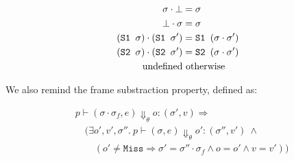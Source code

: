 \documentclass[,a4paper,oneside]{article}
\newcommand{\code}[1]{\texttt{#1}}
\newcommand{\st}[0]{\sigma}
\newcommand{\evalsto}[3]{\ensuremath{p\vdash(#1)\Downarrow_\theta#2:(#3)}}
\newcommand{\Miss}[0]{\code{Miss}}
\begin{document}
\begin{align*}
	\sigma \cdot \bot &= \sigma\\
	\bot \cdot \sigma &= \sigma\\
	(\sone\st) \cdot (\sone\st') &= \sone(\st\cdot\st')\\
	(\stwo\st) \cdot (\stwo\st') &= \stwo(\st\cdot\st')\\
	\text{undefined}&\text{ otherwise}
\end{align*}

We also remind the frame substraction property, defined as:


\begin{align*}
	&\evalsto{\st\cdot\st_f,e}{o}{\st',v}\Longrightarrow\\
	&\quad(\exists o',v',\st''.~\evalsto{\st,e}{o'}{\st'',v'}~\land\\
	&\qquad(o'\neq \Miss \Rightarrow \st'=\st''\cdot\st_f\land o=o'\land v=v'))
\end{align*}

\newcommand{\proofref}[1]{\textbf{\cal(#1)}}
\newcommand{\proofitem}[1]{\item\textbf{\cal(#1)}~}
\end{document}
